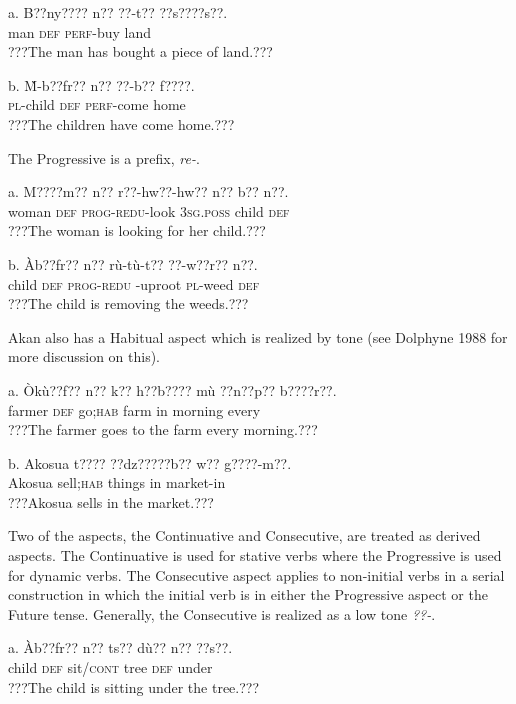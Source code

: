 \documentclass[output=paper]{langsci/langscibook}
\begin{document}
\ea
\gll \textup{a.}  B??ny???? n??  ??-t??     ??s????s??.\\
       man  \textsc{def}  \textsc{perf}{}-buy  land\\
\glt ???The man has bought a piece of land.???
\z

\ea
\gll \textup{b.  }\`{M}-b??fr??  n??  ??-b??    f????.\\
     \textsc{  pl}{}-child  \textsc{def}  \textsc{perf}{}-come  home\\
\glt ???The children have come home.???
\z

The Progressive is a prefix, \emph{re-}.

\ea
\gll \textup{a.  }M????m??   n??  r??-hw??-hw??     n??    b??   n??.\\
       woman    \textsc{def}  \textsc{prog-redu}{}-look  \textsc{3sg.poss}  child  \textsc{def}\\
\glt ???The woman is looking for her child.???
\z

\ea
\gll b.  \`{A}b??fr??  n??  r\`{u}-t\`{u}-t??    ??-w??r??    n??.\\
       child  \textsc{def}  \textsc{prog-redu} -uproot  \textsc{pl}{}-weed  \textsc{def}\\
\glt ???The child is removing the weeds.???
\z

Akan also has a Habitual aspect which is realized by tone (see Dolphyne 1988 for more discussion on this).

\ea
\gll a.  \`{O}k\`{u}??f??  n??   k??    h??b????  m\`{u}  ??n??p??    b????r??.\\
       farmer  \textsc{def}  go;\textsc{hab}    farm  in  morning  every\\
\glt ???The farmer goes to the farm every morning.???
\z

\ea
\gll b.  Akosua    t????     ??dz?????b??  w??  g????-m??.\\
       Akosua  sell;\textsc{hab}  things    in  market-in\\
\glt ???Akosua sells in the market.???
\z

Two of the aspects, the Continuative and Consecutive, are treated as derived aspects. The Continuative is used for stative verbs where the Progressive is used for dynamic verbs. The Consecutive aspect applies to non-initial verbs in a serial construction in which the initial verb is in either the Progressive aspect or the Future tense. Generally, the Consecutive is realized as a low tone \emph{??-}.

\ea
\gll a.  \`{A}b??fr??  n??  ts??    d\`{u}??  n??  ??s??.\\
       child  \textsc{def}  sit/\textsc{cont}  tree  \textsc{def}  under\\
\glt ???The child is sitting under the tree.???
\z
\end{document}
